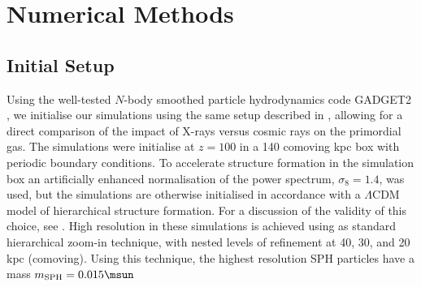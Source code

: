 \section{Numerical Methods}
\label{methods}

\subsection{Initial Setup}
\label{setup}

Using the well-tested $N$-body smoothed particle hydrodynamics code GADGET2 \citep{Springel2005}, we initialise our simulations using the same setup described in \citet{Hummeletal2014}, allowing for a direct comparison of the impact of X-rays versus cosmic rays on the primordial gas.  The simulations were initialise at $z=100$ in a 140 comoving kpc box with periodic boundary conditions. To accelerate structure formation in the simulation box an artificially enhanced normalisation of the power spectrum, $\sigma_8 = 1.4$, was used, but the simulations are otherwise initialised in accordance with a $\Lambda$CDM model of hierarchical structure formation. For a discussion of the validity of this choice, see \citet{StacyGreifBromm2010}. High resolution in these simulations is achieved using as standard hierarchical zoom-in technique, with nested levels of refinement at 40, 30, and 20 kpc (comoving).  Using this technique, the highest resolution SPH particles have a mass $m_{\rm SPH} = 0.015\msun$

